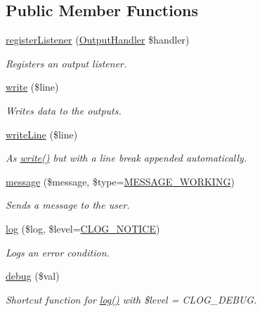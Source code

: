 \subsection*{Public Member Functions}
\begin{DoxyCompactItemize}
\item 
\hyperlink{interfaceOutputManagerInterface_ac17d1f524e73680d73df01eed3a74163}{register\-Listener} (\hyperlink{interfaceOutputHandler}{Output\-Handler} \$handler)
\begin{DoxyCompactList}\small\item\em Registers an output listener. \end{DoxyCompactList}\item 
\hyperlink{interfaceOutputManagerInterface_aeef325f1edd1f975069a38ff1ea173a8}{write} (\$line)
\begin{DoxyCompactList}\small\item\em Writes data to the outputs. \end{DoxyCompactList}\item 
\hyperlink{interfaceOutputManagerInterface_a4820802ba74220d17619d509e988bc6a}{write\-Line} (\$line)
\begin{DoxyCompactList}\small\item\em As \hyperlink{interfaceOutputManagerInterface_aeef325f1edd1f975069a38ff1ea173a8}{write()} but with a line break appended automatically. \end{DoxyCompactList}\item 
\hyperlink{interfaceOutputManagerInterface_af42889ccb9cf2a08cc27c7287495fb5d}{message} (\$message, \$type=\hyperlink{Messenger_8iface_a42a959808a10ab30584347844a7d1657}{M\-E\-S\-S\-A\-G\-E\-\_\-\-W\-O\-R\-K\-I\-N\-G})
\begin{DoxyCompactList}\small\item\em Sends a message to the user. \end{DoxyCompactList}\item 
\hyperlink{interfaceOutputManagerInterface_a9976e3f986355fc263ca75cbd2418338}{log} (\$log, \$level=\hyperlink{group__log__levels_ga8fe5fb4d67cefbcc5556321a2a1ffaec}{C\-L\-O\-G\-\_\-\-N\-O\-T\-I\-C\-E})
\begin{DoxyCompactList}\small\item\em Logs an error condition. \end{DoxyCompactList}\item 
\hyperlink{interfaceOutputManagerInterface_ad98706e407b683f8cbf3d96f014f9b09}{debug} (\$val)
\begin{DoxyCompactList}\small\item\em Shortcut function for \hyperlink{interfaceOutputManagerInterface_a9976e3f986355fc263ca75cbd2418338}{log()} with \$level = C\-L\-O\-G\-\_\-\-D\-E\-B\-U\-G. \end{DoxyCompactList}\end{DoxyCompactItemize}


